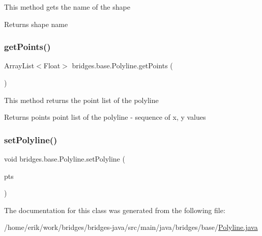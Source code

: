 This method gets the name of the shape

\begin{DoxyReturn}{Returns}
shape name 
\end{DoxyReturn}
\mbox{\label{classbridges_1_1base_1_1_polyline_ae610d680975558db90a06949991583f8}} 
\subsubsection{\texorpdfstring{get\+Points()}{getPoints()}}
{\footnotesize\ttfamily Array\+List$<$Float$>$ bridges.\+base.\+Polyline.\+get\+Points (\begin{DoxyParamCaption}{ }\end{DoxyParamCaption})}

This method returns the point list of the polyline

\begin{DoxyReturn}{Returns}
points point list of the polyline -\/ sequence of x, y values 
\end{DoxyReturn}
\mbox{\label{classbridges_1_1base_1_1_polyline_a3fec0c95e9f26b173cba105bd39e9df1}} 
\subsubsection{\texorpdfstring{set\+Polyline()}{setPolyline()}}
{\footnotesize\ttfamily void bridges.\+base.\+Polyline.\+set\+Polyline (\begin{DoxyParamCaption}\item[{Array\+List$<$ Float $>$}]{pts }\end{DoxyParamCaption})}



The documentation for this class was generated from the following file\+:\begin{DoxyCompactItemize}
\item 
/home/erik/work/bridges/bridges-\/java/src/main/java/bridges/base/\hyperlink{_polyline_8java}{Polyline.\+java}\end{DoxyCompactItemize}
